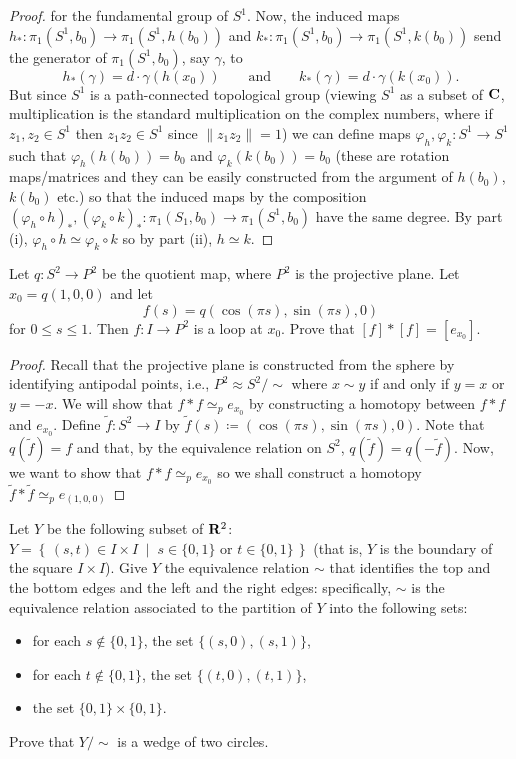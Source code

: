 \begin{proof}
for the fundamental group of $S^1$. Now, the induced maps
$h_*\colon\pi_1(S^1,b_0)\to\pi_1(S^1,h(b_0))$ and
$k_*\colon\pi_1(S^1,b_0)\to\pi_1(S^1,k(b_0))$ send the generator of
$\pi_1(S^1,b_0)$, say $\gamma$, to
\[
h_*(\gamma)=d\cdot\gamma(h(x_0))\qquad\text{and}\qquad
k_*(\gamma)=d\cdot\gamma(k(x_0)).
\]
But since $S^1$ is a path-connected topological group (viewing $S^1$ as a
subset of $\mathbf{C}$, multiplication is the standard multiplication on the
complex numbers, where if $z_1,z_2\in S^1$ then $z_1z_2\in S^1$ since
$\|z_1z_2\|=1$) we can define maps $\varphi_h,\varphi_k\colon S^1\to S^1$
such that $\varphi_h(h(b_0))=b_0$ and $\varphi_k(k(b_0))=b_0$ (these are
rotation maps/matrices and they can be easily constructed from the argument
of $h(b_0)$, $k(b_0)$ etc.) so that the induced maps by the composition
$(\varphi_h\circ h)_*,(\varphi_k\circ
k)_*\colon\pi_1(S_1,b_0)\to\pi_1(S^1,b_0)$ have the same degree. By part
(i), $\varphi_h\circ h\simeq\varphi_k\circ k$ so by part (ii), $h\simeq k$.
\end{proof}
\newpage
\begin{problem}[B]
Let $q\colon S^2\to P^2$ be the quotient map, where $P^2$ is the
projective plane. Let $x_0=q(1,0,0)$ and let
\[f(s)=q(\cos(\pi s),\sin(\pi s),0)\]
for $0\leq s\leq 1$. Then $f\colon I\to P^2$ is a loop at
$x_0$. Prove that $[f]*[f]=[e_{x_0}]$.
\end{problem}
\begin{proof}
Recall that the projective plane is constructed from the sphere by
identifying antipodal points, i.e., $P^2\approx S^2/{\sim}$ where $x\sim y$
if and only if $y=x$ or $y=-x$. We will show that $f*f\simeq_p e_{x_0}$ by
constructing a homotopy between $f*f$ and $e_{x_0}$. Define $\tilde f\colon
S^2\to I$ by $\tilde f(s)\coloneqq(\cos(\pi s),\sin(\pi s),0)$. Note that
$q(\tilde f)=f$ and that, by the equivalence relation on $S^2$, $q(\tilde
f)=q(-\tilde f)$. Now, we want to show that $f*f\simeq_p e_{x_0}$ so we
shall construct a homotopy $\tilde f*\tilde f\simeq_p e_{(1,0,0)}$
\end{proof}
\newpage
\begin{problem}[C]
Let $Y$ be the following subset of $\mathbf{R}^2$: $Y=\left\{\,(s,t)\in
  I\times I\;\middle|\;\text{$s\in\{0,1\}$ or
    $t\in\{0,1\}$}\,\right\}$ (that is, $Y$ is the boundary of
the square $I\times I$). Give $Y$ the equivalence relation $\sim$
that identifies the top and the bottom edges and the left and the
right edges: specifically, $\sim$ is the equivalence relation
associated to the partition of $Y$ into the following sets:
\begin{itemize}
\item for each $s\notin\{0,1\}$, the set $\{(s,0),(s,1)\}$,
\item for each $t\notin\{0,1\}$, the set $\{(t,0),(t,1)\}$,
\item the set $\{0,1\}\times\{0,1\}$.
\end{itemize}
Prove that $Y/{\sim}$ is a wedge of two circles.
\end{problem}
